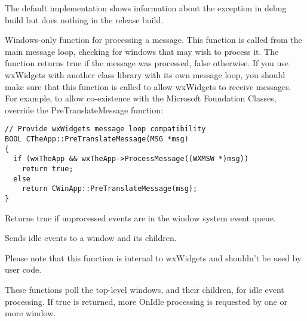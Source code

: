 The default implementation shows information about the exception in debug build
but does nothing in the release build.


\label{wxappprocessmessage}


Windows-only function for processing a message. This function
is called from the main message loop, checking for windows that
may wish to process it. The function returns true if the message
was processed, false otherwise. If you use wxWidgets with another class
library with its own message loop, you should make sure that this
function is called to allow wxWidgets to receive messages. For example,
to allow co-existence with the Microsoft Foundation Classes, override
the PreTranslateMessage function:

\begin{verbatim}
// Provide wxWidgets message loop compatibility
BOOL CTheApp::PreTranslateMessage(MSG *msg)
{
  if (wxTheApp && wxTheApp->ProcessMessage((WXMSW *)msg))
    return true;
  else
    return CWinApp::PreTranslateMessage(msg);
}
\end{verbatim}


\label{wxapppending}


Returns true if unprocessed events are in the window system event queue.




\label{wxappsendidleevents}


Sends idle events to a window and its children.

Please note that this function is internal to wxWidgets and shouldn't be used
by user code.


These functions poll the top-level windows, and their children, for idle event processing.
If true is returned, more OnIdle processing is requested by one or more window.




\label{wxappsetappdisplayname}

